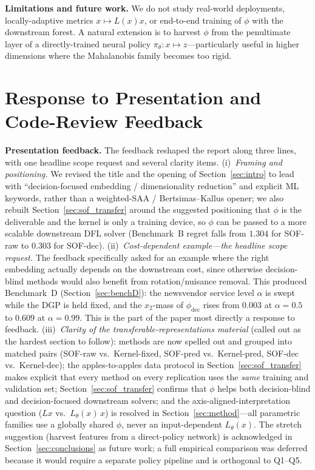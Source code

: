 \documentclass[11pt]{article}
\begin{document}
\textbf{Limitations and future work.} We do not study real-world deployments, locally-adaptive metrics $x\mapsto L(x)x$, or end-to-end training of $\phi$ with the downstream forest. A natural extension is to harvest $\phi$ from the penultimate layer of a directly-trained neural policy $\pi_\theta:x\mapsto z$---particularly useful in higher dimensions where the Mahalanobis family becomes too rigid.

\section{Response to Presentation and Code-Review Feedback}\label{sec:feedback}

\textbf{Presentation feedback.} The feedback reshaped the report along three lines, with one headline scope request and several clarity items. (i)~\emph{Framing and positioning.} We revised the title and the opening of Section~\ref{sec:intro} to lead with ``decision-focused embedding / dimensionality reduction'' and explicit ML keywords, rather than a weighted-SAA / Bertsimas--Kallus opener; we also rebuilt Section~\ref{sec:sof_transfer} around the suggested positioning that $\phi$ is the deliverable and the kernel is only a training device, so $\phi$ can be passed to a more scalable downstream DFL solver (Benchmark~B regret falls from $1.304$ for SOF-raw to $0.303$ for SOF-dec). (ii)~\emph{Cost-dependent example---the headline scope request.} The feedback specifically asked for an example where the right embedding actually depends on the downstream cost, since otherwise decision-blind methods would also benefit from rotation/nuisance removal. This produced Benchmark~D (Section~\ref{sec:benchD}): the newsvendor service level $\alpha$ is swept while the DGP is held fixed, and the $x_2$-mass of $\phi_{\mathrm{dec}}$ rises from $0.003$ at $\alpha=0.5$ to $0.609$ at $\alpha=0.99$. This is the part of the paper most directly a response to feedback. (iii)~\emph{Clarity of the transferable-representations material} (called out as the hardest section to follow): methods are now spelled out and grouped into matched pairs (SOF-raw vs.\ Kernel-fixed, SOF-pred vs.\ Kernel-pred, SOF-dec vs.\ Kernel-dec); the apples-to-apples data protocol in Section~\ref{sec:sof_transfer} makes explicit that every method on every replication uses the \emph{same} training and validation set; Section~\ref{sec:sof_transfer} confirms that $\phi$ helps both decision-blind and decision-focused downstream solvers; and the axis-aligned-interpretation question ($Lx$ vs.\ $L_\theta(x)\,x$) is resolved in Section~\ref{sec:method}---all parametric families use a globally shared $\phi$, never an input-dependent $L_\theta(x)$. The stretch suggestion (harvest features from a direct-policy network) is acknowledged in Section~\ref{sec:conclusions} as future work; a full empirical comparison was deferred because it would require a separate policy pipeline and is orthogonal to Q1--Q5.
\end{document}
